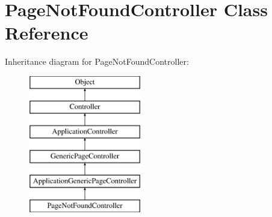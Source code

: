 \hypertarget{class_page_not_found_controller}{
\section{PageNotFoundController Class Reference}
\label{class_page_not_found_controller}
}
Inheritance diagram for PageNotFoundController:\begin{figure}[H]
\begin{center}
\leavevmode
\includegraphics[height=6.000000cm]{class_page_not_found_controller}
\end{center}
\end{figure}
